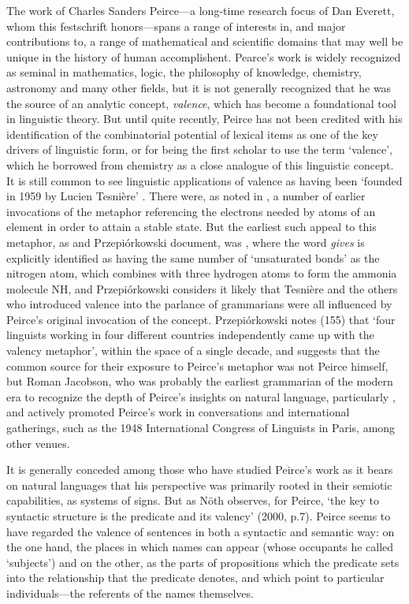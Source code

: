 \documentclass[output=paper,colorlinks,citecolor=brown]{langscibook}
\begin{document}
The work of Charles Sanders Peirce---a long-time research focus of Dan
Everett, whom this festschrift honors---spans a range of interests in,
and major contributions to, a range of mathematical and scientific
domains that may well be unique in the history of human
accomplishent. Pearce's work is widely recognized as seminal in
mathematics, logic, the philosophy of knowledge, chemistry, astronomy
and many other fields, but it is not generally recognized that he was
the source of an analytic concept, \textsl{valence}, which has become
a foundational tool in linguistic theory. But until quite recently,
Peirce has not been credited with his identification of the
combinatorial potential of lexical items as one of the key drivers of
linguistic form, or for being the first scholar to use the term
`valence', which he borrowed from chemistry as a close analogue of
this linguistic concept. It is still common to see linguistic
applications of valence as having been `founded in 1959 by Lucien
Tesnière' \citet{hollein2022}. There were, as noted in \citet{AdamP-Peirce}, a
number of earlier invocations of the metaphor referencing the
electrons needed by atoms of an element in order to attain a stable
state. But the earliest such appeal to this metaphor, as \citet{askedal91}
and Przepi\'{o}rkowski document, was \citet{peirce1897}, where the word
\textit{gives} is explicitly identified as having the same number of
`unsaturated bonds' as the nitrogen atom, which combines with three
hydrogen atoms to form the ammonia molecule NH, and
Przepi{\'o}rkowski considers it likely that Tesnière and the
others who introduced valence into the parlance of grammarians were
all influenced by Peirce's original invocation of the
concept. Przepi{\'o}rkowski notes (155) that `four linguists working
in four different countries independently came up with the valency
metaphor', within the space of a single decade, and suggests that the
common source for their exposure to Peirce's metaphor was not Peirce
himself, but Roman Jacobson, who was probably the earliest
grammarian of the modern era to recognize the depth of Peirce's
insights on natural language, particularly \citet{peirce1897}, and actively
promoted Peirce's work in conversations and international gatherings,
such as the 1948 International Congress of Linguists in Paris, among
other venues.

It is generally conceded among those who have studied Peirce's work as
it bears on natural languages that his perspective was primarily
rooted in their semiotic capabilities, as systems of signs. But as
Nöth observes, for Peirce, `the key to syntactic structure is the
predicate and its valency' (2000, p.7)\nocite{nothPeirce}. Peirce
seems to have regarded the valence of sentences in both a syntactic
and semantic way: on the one hand, the places in which names can
appear (whose occupants he called `subjects') and on the other, as the
parts of propositions which the predicate sets into the relationship
that the predicate denotes, and which point to particular
individuals---the referents of the names themselves.
\end{document}
